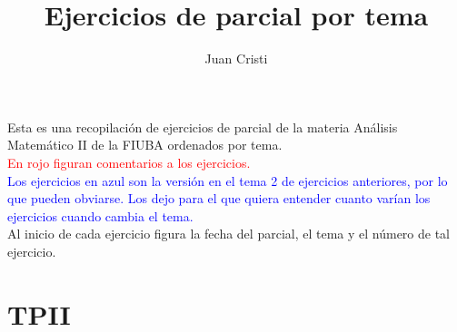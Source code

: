 \documentclass[12pt,a4paper]{article}
\author{Juan Cristi} %
\title{Ejercicios de parcial por tema}
\newcommand{\red}[1]{\textcolor{red}{#1}}
\newcommand{\blue}[1]{\textcolor{blue}{#1}}
\begin{document}
\maketitle
Esta es una recopilación de ejercicios de parcial de la materia Análisis Matemático II de la FIUBA ordenados por tema. \\

\red{En rojo figuran comentarios a los ejercicios.}\\

\blue{Los ejercicios en azul son la versión en el tema 2 de ejercicios anteriores, por lo que pueden obviarse. Los dejo para el que quiera entender cuanto varían los ejercicios cuando cambia el tema.}\\

Al inicio de cada ejercicio figura la fecha del parcial, el tema y el número de tal ejercicio.

\section{TPII}
\end{document}
